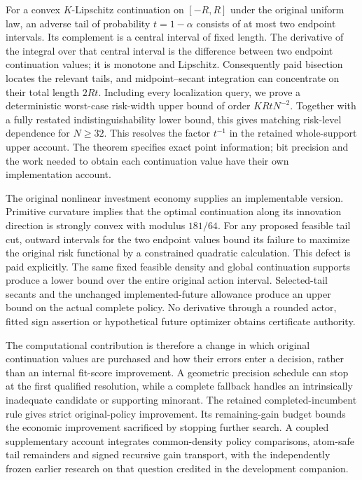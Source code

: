 For a convex $K$-Lipschitz continuation on $[-R,R]$ under the original uniform
law, an adverse tail of probability $t=1-\alpha$ consists of at most two
endpoint intervals. Its complement is a central interval of fixed length.
The derivative of the integral over that central interval is the difference
between two endpoint continuation values; it is monotone and Lipschitz.
Consequently paid bisection locates the relevant tails, and midpoint--secant
integration can concentrate on their total length $2Rt$. Including every
localization query, we prove a deterministic worst-case risk-width upper bound
of order $KRtN^{-2}$. Together with a fully restated indistinguishability
lower bound, this gives matching risk-level dependence for $N\ge32$. This
resolves the factor $t^{-1}$ in the retained whole-support upper account.
The theorem specifies exact point information; bit precision and the work
needed to obtain each continuation value have their own implementation account.

The original nonlinear investment economy supplies an implementable version.
Primitive curvature implies that the optimal continuation along its innovation
direction is strongly convex with modulus $181/64$. For any proposed feasible
tail cut, outward intervals for the two endpoint values bound its failure to
maximize the original risk functional by a constrained quadratic calculation.
This defect is paid explicitly. The same fixed feasible density and global
continuation supports produce a lower bound over the entire original action
interval. Selected-tail secants and the unchanged implemented-future allowance
produce an upper bound on the actual complete policy. No derivative through
a rounded actor, fitted sign assertion or hypothetical future optimizer obtains
certificate authority.

The computational contribution is therefore a change in which original
continuation values are purchased and how their errors enter a decision,
rather than an internal fit-score improvement. A geometric precision schedule
can stop at the first qualified resolution, while a complete fallback handles
an intrinsically inadequate candidate or supporting minorant. The retained
completed-incumbent rule gives strict original-policy improvement. Its
remaining-gain budget bounds the economic improvement sacrificed by stopping
further search. A coupled supplementary account integrates common-density
policy comparisons, atom-safe tail remainders and signed recursive gain
transport, with the independently frozen earlier research on that question
credited in the development companion.

